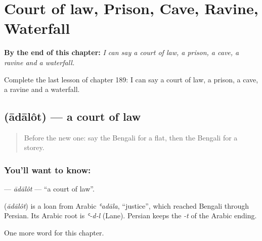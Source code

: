 
\chapter{Court of law, Prison, Cave, Ravine, Waterfall}
\label{ch:bn-court-of-law-prison-cave-ravine-waterfall}

\begin{chapteropening}
\textbf{By the end of this chapter:} \emph{I can say a court of law, a prison, a cave, a ravine and a waterfall.}

Complete the last lesson of chapter 189: I can say a court of law, a prison, a cave, a ravine and a waterfall.
\end{chapteropening}

\section[\texorpdfstring{\bn{আদালত} (ādālôt)}{আদালত (ādālôt)}]{ (ādālôt) — a court of law}

\label{lesson:BN-C189-adalot}



\begin{quote}
Before the new one: say the Bengali for a flat, then the Bengali for a storey.
\end{quote}

\subsection*{You'll want to know: }
\textbf{} — \emph{ādālôt} — \textquotedblleft{}a court of law\textquotedblright{}.

\begin{cousinweb}
\textbf{} (\emph{ādālôt}) is a loan from Arabic \emph{ʿadāla}, \textquotedblleft{}justice\textquotedblright{}, which reached Bengali through Persian. Its Arabic root is \emph{ʿ-d-l} (Lane). Persian keeps the \emph{-t} of the Arabic ending.
\end{cousinweb}

\begin{grammarlens}[title={What you've built}]
One more word for this chapter.
\end{grammarlens}

